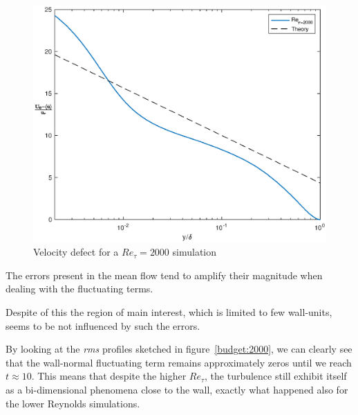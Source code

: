 \begin{figure}
\begin{center}
\includegraphics[scale=0.55]{grafici/velocity_defect_2000.eps}
\caption{Velocity defect for a $Re_{\tau}=2000$ simulation}
\label{velocity:defect:2000}
\end{center} 
\end{figure}

The errors present in the mean flow tend to amplify their magnitude when dealing with the fluctuating terms.\par
Despite of this the region of main interest, which is limited to few wall-units, seems to be not influenced by such the errors.  \par
By looking at the \emph{rms} profiles sketched in figure~\ref{budget:2000}, we can clearly see that the wall-normal fluctuating term remains approximately zeros until we reach $t\approx10$. This means that despite the higher $Re_{\tau}$, the turbulence still exhibit itself as a bi-dimensional phenomena close to the wall, exactly what happened also for the lower Reynolds simulations.\par

